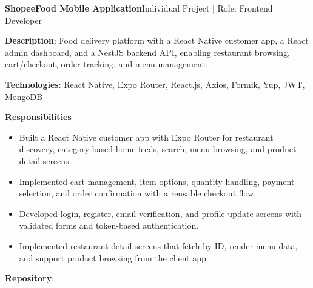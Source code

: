   \resumeProjectHeading
    {\textbf{ShopeeFood Mobile Application}}{Individual Project | Role: Frontend Developer}
    \resumeItemListStart
      \item \textbf{Description}: Food delivery platform with a React Native customer app, a React admin dashboard,
        and a NestJS backend API, enabling restaurant browsing, cart/checkout, order tracking, and menu management.
      \item \textbf{Technologies}: React Native, Expo Router, React.js, Axios, Formik, Yup, JWT, MongoDB
      \item \textbf{Responsibilities}
        \begin{itemize}
          \item Built a React Native customer app with Expo Router for restaurant discovery, category-based home feeds, search, menu browsing, and product detail screens.
          \item Implemented cart management, item options, quantity handling, payment selection, and order confirmation with a reusable checkout flow.
          \item Developed login, register, email verification, and profile update screens with validated forms and token-based authentication.
          \item Implemented restaurant detail screens that fetch by ID, render menu data, and support product browsing from the client app.
        \end{itemize}
      \item \textbf{Repository}: \href{https://github.com/nvminh162/shopeefood-app}{}
    \resumeItemListEnd

\resumeSubHeadingListEnd
